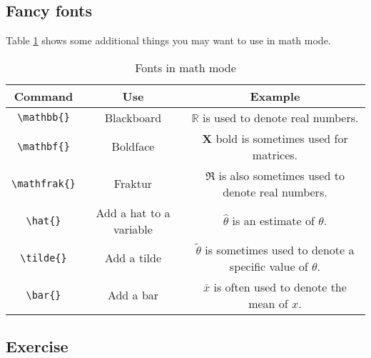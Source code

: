 \subsection{Fancy fonts}

Table \ref{tab:fonts} shows some additional things you may want to use in math mode.

\begin{table}[h]
	\centering
	\label{tab:fonts}
	\caption{Fonts in math mode}
\begin{small}
  \begin{center}
    \begin{tabular}{c c c}
      \hline
Command & Use & Example \\ \hline
\verb|\mathbb{}| & Blackboard & $\mathbb{R}$ is used to denote real numbers.\\
\verb|\mathbf{}| & Boldface & $\mathbf{X}$ bold is sometimes used for matrices.\\
\verb|\mathfrak{}| & Fraktur & $\mathfrak{R}$ is also sometimes used to denote real numbers.\\
\verb|\hat{}| & Add a hat to a variable & $\hat{\theta}$ is an estimate of $\theta$.\\
\verb|\tilde{}| & Add a tilde & $\tilde{\theta}$ is sometimes used to denote a specific value of $\theta$.\\
\verb|\bar{}| & Add a bar & $\bar{x}$ is often used to denote the mean of $x$.\\



      \hline
    \end{tabular}
  \end{center}
\end{small}
\end{table}



\subsection{Exercise} 